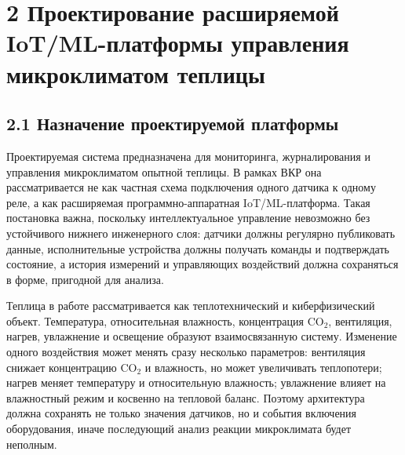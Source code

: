 \documentclass[a4paper,14pt]{extarticle}
\begin{document}
\hypertarget{ux43fux440ux43eux435ux43aux442ux438ux440ux43eux432ux430ux43dux438ux435-ux440ux430ux441ux448ux438ux440ux44fux435ux43cux43eux439-iotml-ux43fux43bux430ux442ux444ux43eux440ux43cux44b-ux443ux43fux440ux430ux432ux43bux435ux43dux438ux44f-ux43cux438ux43aux440ux43eux43aux43bux438ux43cux430ux442ux43eux43c-ux442ux435ux43fux43bux438ux446ux44b}{%
\section{2 Проектирование расширяемой IoT/ML-платформы управления
микроклиматом
теплицы}\label{ux43fux440ux43eux435ux43aux442ux438ux440ux43eux432ux430ux43dux438ux435-ux440ux430ux441ux448ux438ux440ux44fux435ux43cux43eux439-iotml-ux43fux43bux430ux442ux444ux43eux440ux43cux44b-ux443ux43fux440ux430ux432ux43bux435ux43dux438ux44f-ux43cux438ux43aux440ux43eux43aux43bux438ux43cux430ux442ux43eux43c-ux442ux435ux43fux43bux438ux446ux44b}}

\hypertarget{ux43dux430ux437ux43dux430ux447ux435ux43dux438ux435-ux43fux440ux43eux435ux43aux442ux438ux440ux443ux435ux43cux43eux439-ux43fux43bux430ux442ux444ux43eux440ux43cux44b}{%
\subsection{2.1 Назначение проектируемой
платформы}\label{ux43dux430ux437ux43dux430ux447ux435ux43dux438ux435-ux43fux440ux43eux435ux43aux442ux438ux440ux443ux435ux43cux43eux439-ux43fux43bux430ux442ux444ux43eux440ux43cux44b}}

Проектируемая система предназначена для мониторинга, журналирования и
управления микроклиматом опытной теплицы. В рамках ВКР она
рассматривается не как частная схема подключения одного датчика к одному
реле, а как расширяемая программно-аппаратная IoT/ML-платформа. Такая
постановка важна, поскольку интеллектуальное управление невозможно без
устойчивого нижнего инженерного слоя: датчики должны регулярно
публиковать данные, исполнительные устройства должны получать команды и
подтверждать состояние, а история измерений и управляющих воздействий
должна сохраняться в форме, пригодной для анализа.

Теплица в работе рассматривается как теплотехнический и киберфизический
объект. Температура, относительная влажность, концентрация CO\(_2\),
вентиляция, нагрев, увлажнение и освещение образуют взаимосвязанную
систему. Изменение одного воздействия может менять сразу несколько
параметров: вентиляция снижает концентрацию CO\(_2\) и влажность, но
может увеличивать теплопотери; нагрев меняет температуру и относительную
влажность; увлажнение влияет на влажностный режим и косвенно на тепловой
баланс. Поэтому архитектура должна сохранять не только значения
датчиков, но и события включения оборудования, иначе последующий анализ
реакции микроклимата будет неполным.
\end{document}
